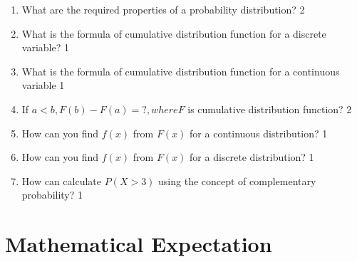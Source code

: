 \documentclass[a4paper,oneside, margin=1.4in]{book}
\begin{document}
\begin{enumerate}
\item What are the required properties of a probability distribution? \hfill 2

\item What is the formula of cumulative distribution function for a discrete variable? \hfill 1

\item What is the formula of cumulative distribution function for a continuous variable \hfill 1

\item If $a<b, F(b) - F(a) = ?, where F$ is cumulative distribution function? \hfill 2

\item How can you find $f(x)$ from $F(x)$ for a continuous distribution? \hfill 1

\item How can you find $f(x)$ from $F(x)$ for a discrete distribution? \hfill 1

  \item How can calculate $P(X>3)$ using the concept of complementary probability?  \hfill 1




  \end{enumerate}

\chapter{Mathematical Expectation} 
\end{document}
